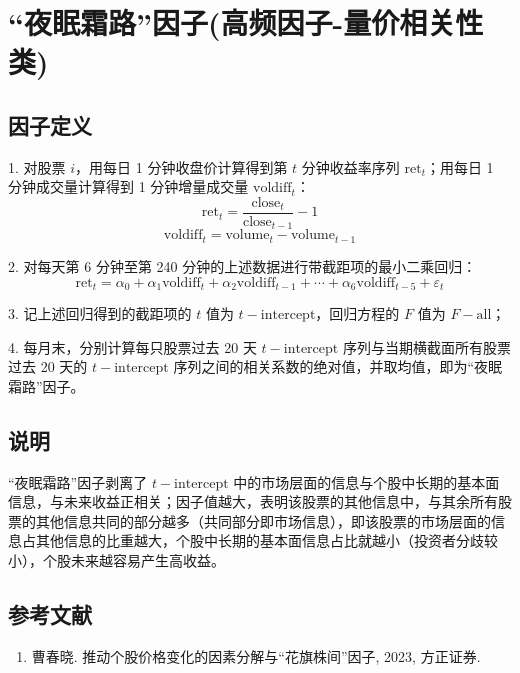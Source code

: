 \documentclass{article}
\begin{document}
\section{“夜眠霜路”因子(高频因子-量价相关性类)}

\subsection{因子定义}

1. 对股票 \( i \)，用每日 1 分钟收盘价计算得到第 \( t \) 分钟收益率序列 \( \mathrm{ret}_t \)；用每日 1 分钟成交量计算得到 1 分钟增量成交量 \( \mathrm{voldiff}_t \)：
\begin{equation}
    \mathrm{ret}_t = \frac{\mathrm{close}_t}{\mathrm{close}_{t-1}} - 1
\end{equation}
\begin{equation}
    \mathrm{voldiff}_t = \mathrm{volume}_t - \mathrm{volume}_{t-1}
\end{equation}

2. 对每天第 6 分钟至第 240 分钟的上述数据进行带截距项的最小二乘回归：
\begin{equation}
    \mathrm{ret}_t = \alpha_0 + \alpha_1 \mathrm{voldiff}_t + \alpha_2 \mathrm{voldiff}_{t-1} + \cdots + \alpha_6 \mathrm{voldiff}_{t-5} + \varepsilon_t
\end{equation}

3. 记上述回归得到的截距项的 \( t \) 值为 \( t-{\mathrm{intercept}} \)，回归方程的 \( F \) 值为 \( F-{\mathrm{all}} \)；

4. 每月末，分别计算每只股票过去 20 天 \( t-{\mathrm{intercept}} \) 序列与当期横截面所有股票过去 20 天的 \( t-{\mathrm{intercept}} \) 序列之间的相关系数的绝对值，并取均值，即为“夜眠霜路”因子。

\subsection{说明}
“夜眠霜路”因子剥离了 \( t-{\mathrm{intercept}} \) 中的市场层面的信息与个股中长期的基本面信息，与未来收益正相关；因子值越大，表明该股票的其他信息中，与其余所有股票的其他信息共同的部分越多（共同部分即市场信息），即该股票的市场层面的信息占其他信息的比重越大，个股中长期的基本面信息占比就越小（投资者分歧较小），个股未来越容易产生高收益。

\subsection{参考文献}
\begin{enumerate}
    \item 曹春晓. 推动个股价格变化的因素分解与“花旗株间”因子, 2023, 方正证券.
\end{enumerate}
\end{document}
